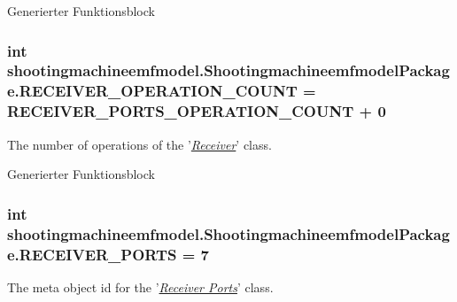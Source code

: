 Generierter Funktionsblock  \hypertarget{interfaceshootingmachineemfmodel_1_1_shootingmachineemfmodel_package_a70f27e8d7418401ff232f3f3a11b4cbe}{
\subsubsection[{R\-E\-C\-E\-I\-V\-E\-R\-\_\-\-O\-P\-E\-R\-A\-T\-I\-O\-N\-\_\-\-C\-O\-U\-N\-T}]{\setlength{\rightskip}{0pt plus 5cm}int shootingmachineemfmodel.\-Shootingmachineemfmodel\-Package.\-R\-E\-C\-E\-I\-V\-E\-R\-\_\-\-O\-P\-E\-R\-A\-T\-I\-O\-N\-\_\-\-C\-O\-U\-N\-T = {\bf R\-E\-C\-E\-I\-V\-E\-R\-\_\-\-P\-O\-R\-T\-S\-\_\-\-O\-P\-E\-R\-A\-T\-I\-O\-N\-\_\-\-C\-O\-U\-N\-T} + 0}}\label{interfaceshootingmachineemfmodel_1_1_shootingmachineemfmodel_package_a70f27e8d7418401ff232f3f3a11b4cbe}
The number of operations of the '{\itshape \hyperlink{interfaceshootingmachineemfmodel_1_1_receiver}{Receiver}}' class.

Generierter Funktionsblock  \hypertarget{interfaceshootingmachineemfmodel_1_1_shootingmachineemfmodel_package_ad41eaba854eca734766639cd163028bc}{
\subsubsection[{R\-E\-C\-E\-I\-V\-E\-R\-\_\-\-P\-O\-R\-T\-S}]{\setlength{\rightskip}{0pt plus 5cm}int shootingmachineemfmodel.\-Shootingmachineemfmodel\-Package.\-R\-E\-C\-E\-I\-V\-E\-R\-\_\-\-P\-O\-R\-T\-S = 7}}\label{interfaceshootingmachineemfmodel_1_1_shootingmachineemfmodel_package_ad41eaba854eca734766639cd163028bc}
The meta object id for the '\hyperlink{classshootingmachineemfmodel_1_1impl_1_1_receiver_ports_impl}{{\itshape Receiver Ports}}' class.

